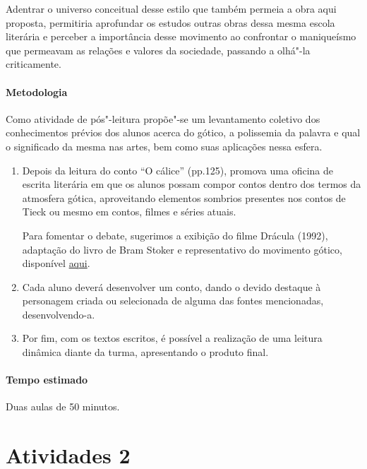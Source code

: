 \documentclass[12pt]{extarticle}
\begin{document}
Adentrar o universo conceitual desse estilo que também permeia a obra aqui proposta, 
permitiria aprofundar os estudos outras obras dessa mesma escola literária e perceber 
a importância desse movimento ao confrontar o maniqueísmo que permeavam as relações e 
valores da sociedade, passando a olhá"-la criticamente.

\paragraph{Metodologia}
Como atividade de pós"-leitura propõe"-se um levantamento coletivo dos
conhecimentos prévios dos alunos acerca do gótico, a polissemia da palavra e qual o
significado da mesma nas artes, bem como suas aplicações nessa esfera.

\begin{enumerate}


\item 
Depois da leitura do conto ``O cálice'' (pp.125), promova uma oficina de escrita literária
em que os alunos possam compor contos dentro dos termos da atmosfera gótica, aproveitando
elementos sombrios presentes nos contos de Tieck ou mesmo em contos,
filmes e séries atuais.

Para fomentar o debate, sugerimos a exibição do filme Drácula (1992), adaptação do livro 
de Bram Stoker e representativo do movimento gótico, disponível \href{https://www.youtube.com/watch?v=WmRtEHi7Op0&ab_channel=CineAntiquaRed}{aqui}.

\item 
Cada aluno deverá desenvolver um conto, dando o devido destaque à
personagem criada ou selecionada de alguma das fontes mencionadas,
desenvolvendo-a. 

\item 
Por fim, com os textos escritos, é
possível a realização de uma leitura dinâmica diante da turma,
apresentando o produto final.

\end{enumerate}

\paragraph{Tempo estimado} Duas aulas de 50 minutos. 


\section{Atividades 2}
\end{document}
